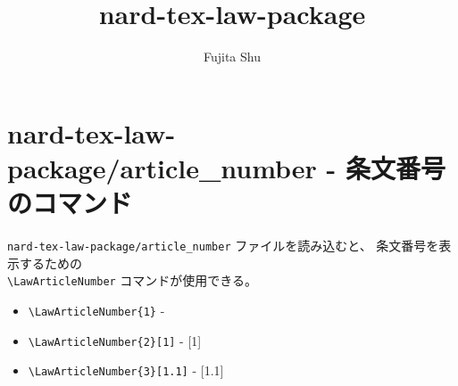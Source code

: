 \documentclass[oneside,10pt,a4paper]{jsarticle}
\title{nard-tex-law-package}
\author{Fujita Shu}
\begin{document}
  \maketitle

  \section{nard-tex-law-package/article\_number - 条文番号のコマンド}

  \verb|nard-tex-law-package/article_number| ファイルを読み込むと、
  条文番号を表示するための\\
  \verb|\LawArticleNumber| コマンドが使用できる。

  \begin{itemize}
    \item \verb|\LawArticleNumber{1}| - 
    \item \verb|\LawArticleNumber{2}[1]| - [1]
    \item \verb|\LawArticleNumber{3}[1.1]| - [1.1]
  \end{itemize}
\end{document}
